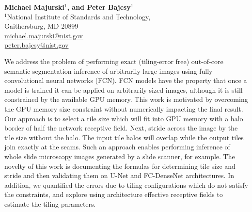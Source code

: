 \documentclass[10pt, indentfirst]{article}
\begin{document}
\setcounter{page}{1}


\title{\Huge{\textit{\papertitle}}
}
\date{\vspace{-7ex}}

\vspace*{-70pt}{\let\newpage\relax\maketitle}
\maketitle
\thispagestyle{title}
\begin{flushleft} \normalsize \textbf{Michael Majurski$^1$, and Peter Bajcsy$^1$} \\
	\vspace{9pt} 
	\normalsize $^1$National Institute of Standards and Technology, \\  
	Gaithersburg, MD 20899 \\
	
	\vspace{15pt} 
	\footnotesize \url{michael.majurski@nist.gov}\\
	\footnotesize \url{peter.bajcsy@nist.gov}\\
	\vspace{20pt} 
	
We address the problem of performing exact (tiling-error free) out-of-core semantic segmentation inference of arbitrarily large images using fully convolutional neural networks (FCN). FCN models have the property that once a model is trained it can be applied on arbitrarily sized images, although it is still constrained by the available GPU memory. This work is motivated by overcoming the GPU memory size constraint without numerically impacting the final result. 
Our approach is to select a tile size which will fit into GPU memory with a halo border of half the network receptive field. Next, stride across the image by the tile size without the halo. The input tile halos will overlap while the output tiles join exactly at the seams. Such an approach enables performing inference of whole slide microscopy images generated by a slide scanner, for example.
The novelty of this work is documenting the formulas for determining tile size and stride and then validating them on U-Net and FC-DenseNet architectures.
In addition, we quantified the errors due to tiling configurations which do not satisfy the constraints, and explore using architecture effective receptive fields to estimate the tiling parameters. 
\\
	

\end{flushleft}
\end{document}
